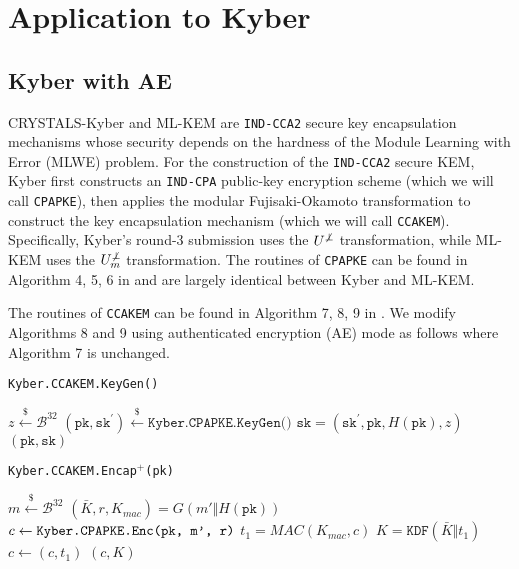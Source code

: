 \documentclass[floatrow,journal=tches,submission]{iacrtrans}
\newcommand{\pk}{\texttt{pk}}
\newcommand{\sk}{\texttt{sk}}
\newcommand{\leftsample}{\stackrel{\$}{\leftarrow}}
\begin{document}
% 

\section{Application to Kyber}

\subsection{Kyber with AE}
CRYSTALS-Kyber \cite{bos2018crystals}\cite{avanzi2019crystals} and ML-KEM \cite{key2023mechanism} are \texttt{IND-CCA2} secure key encapsulation mechanisms whose security depends on the hardness of the Module Learning with Error (MLWE) problem. For the construction of the \texttt{IND-CCA2} secure KEM, Kyber first constructs an \texttt{IND-CPA} public-key encryption scheme (which we will call \texttt{CPAPKE}), then applies the modular Fujisaki-Okamoto transformation \cite{hofheinz2017modular} to construct the key encapsulation mechanism (which we will call \texttt{CCAKEM}). Specifically, Kyber's round-3 submission uses the $U^{\not\bot}$ transformation, while ML-KEM uses the $U^{\not\bot}_m$ transformation. The routines of \texttt{CPAPKE} can be found in Algorithm 4, 5, 6 in \cite{avanzi2019crystals} and are largely identical between Kyber and ML-KEM. 

The routines of \texttt{CCAKEM} can be found in Algorithm 7, 8, 9 in \cite{avanzi2019crystals}. We modify Algorithms 8 and 9 using authenticated encryption (AE)  mode as follows where Algorithm 7 is unchanged.

\begin{algorithm}[H]
    \caption{\texttt{Kyber.CCAKEM.KeyGen()}}
    \begin{algorithmic}[1]
        \State $z \leftsample \mathcal{B}^{32}$
        \State $(\pk, \sk^\prime) \leftsample \texttt{Kyber.CPAPKE.KeyGen()}$
        \State $\sk = (\sk^\prime, \pk, H(\pk), z)$
        \State \Return $(\pk, \sk)$
    \end{algorithmic}
\end{algorithm}

\begin{algorithm}[H]
    \caption{\texttt{Kyber.CCAKEM.Encap$^+$(\pk)}}
    \begin{algorithmic}[1]
        \State $m \leftsample \mathcal{B}^{32}$
        \State $(\bar{K}, r, K_{mac}) = G(m' \Vert H(\pk))$
        \State $c  \leftarrow \texttt{Kyber.CPAPKE.Enc(\pk, m', r)}$
            \State $t_1=MAC(K_{mac}, c)$
        \State $K = \texttt{KDF}(\bar{K} \Vert t_1)$
        \State $c \leftarrow (c, t_1)$
        \State \Return $(c, K)$
    \end{algorithmic}
\end{algorithm}
\end{document}
